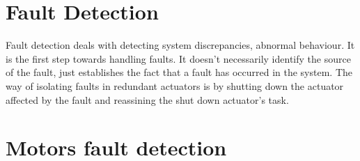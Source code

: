 \section{Fault Detection}

Fault detection deals with detecting system discrepancies, abnormal behaviour. It is the first step towards handling faults. It doesn't necessarily identify the source of the fault, just establishes the fact that a fault has occurred in the system. The way of isolating faults in redundant actuators is by shutting down the actuator affected by the fault and reassining the shut down actuator's task.


\section{Motors fault detection}












